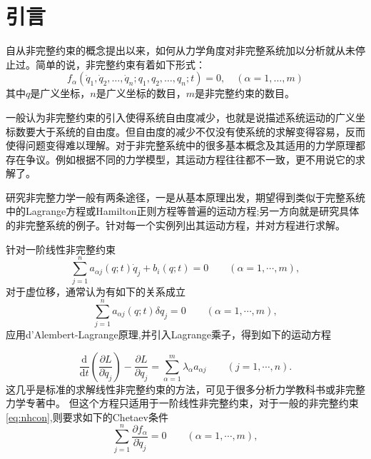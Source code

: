 \documentclass{ctexart}
\newcommand{\mathd}{\mathrm{d}}
\begin{document}
\section{引言}
\label{sec:intr}
自从非完整约束的概念提出以来，如何从力学角度对非完整系统加以分析就从未停止过。简单的说，非完整约束有着如下形式：
\begin{equation}
  \label{eq:nhcon}
  f_{\alpha}(\dot{q}_1,\dot{q}_2,\ldots,\dot{q}_n;q_1,q_2,\ldots,q_n;t)=0,\quad(\alpha=1,\ldots,m)
\end{equation}
其中$q$是广义坐标，$n$是广义坐标的数目，$m$是非完整约束的数目。

一般认为非完整约束的引入使得系统自由度减少，也就是说描述系统运动的广义坐标数要大于系统的自由度。但自由度的减少不仅没有使系统的求解变得容易，反而使得问题变得难以理解。对于非完整系统中的很多基本概念及其适用的力学原理都存在争议。例如根据不同的力学模型，其运动方程往往都不一致，更不用说它的求解了。

研究非完整力学一般有两条途径，一是从基本原理出发，期望得到类似于完整系统中的Lagrange方程或Hamilton正则方程等普遍的运动方程;另一方向就是研究具体的非完整系统的例子。针对每一个实例列出其运动方程，并对方程进行求解。

针对一阶线性非完整约束
\begin{equation}
  \label{eq:linearnhcon}
    \sum_{j = 1}^n a_{\alpha j} ( q ; t) \dot{q}_j + b_i (q; t) = 0 \hspace{2em} ( \alpha =
  1, \cdots, m),
\end{equation}
对于虚位移，通常认为有如下的关系成立
\begin{equation}
  \label{eq:linearcheatev}
   \sum_{j = 1}^n a_{\alpha j} ( q ; t) \delta q_j = 0 \hspace{2em} ( \alpha = 1, \cdots, m),
\end{equation}
应用d'Alembert-Lagrange原理,并引入Lagrange乘子，得到如下的运动方程

\begin{equation}
  \label{eq:lineareom}
    \frac{\mathd}{\mathd t} \left( \frac{\partial L}{\partial \dot{q}_j}
   \right) - \frac{\partial L}{\partial q_j} = \sum_{\alpha = 1}^m \lambda_\alpha a_{\alpha
   j} \hspace{2em} ( j = 1, \cdots, n) .
\end{equation}
这几乎是标准的求解线性非完整约束的方法，可见于很多分析力学教科书或非完整力学专著中。
但这个方程只适用于一阶线性非完整约束，对于一般的非完整约束\eqref{eq:nhcon},则要求如下的Chetaev条件
\begin{equation}
  \label{eq:cheatev}
 \sum_{j = 1}^n \frac{\partial f_\alpha}{\partial \dot{q}_j}=0\hspace{2em} ( \alpha = 1, \cdots, m),
\end{equation}
\end{document}
